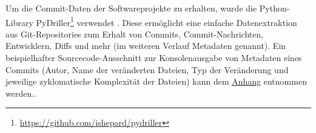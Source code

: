 \begin{table}[ht]
\centering
\caption{Übersicht der verwendeten Softwareprojekte}
\label{tab:tools}
\end{table}

Um die Commit-Daten der Softwareprojekte zu erhalten, wurde die Python-Library PyDriller\footnote{\href{https://github.com/ishepard/pydriller}{https://github.com/ishepard/pydriller}} verwendet \cite{Spadini2018}. Diese ermöglicht eine einfache Datenextraktion aus Git-Repositories zum Erhalt von Commits, Commit-Nachrichten, Entwicklern, Diffs und mehr (im weiteren Verlauf \glqq Metadaten\grqq{} genannt). Ein beispielhafter Sourcecode-Ausschnitt zur Konsolenausgabe von Metadaten eines Commits (Autor, Name der veränderten Dateien, Typ der Veränderung und jeweilige zyklomatische Komplexität der Dateien) kann dem \hyperref[appendix4]{Anhang} entnommen werden.. 


